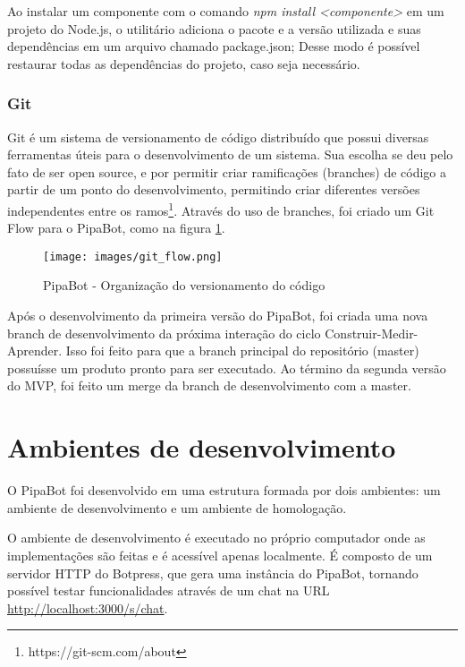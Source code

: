   Ao instalar um componente com o comando \emph{npm install <componente>} em um projeto do Node.js, o utilitário adiciona o pacote e a versão utilizada e suas dependências em um arquivo chamado package.json;  
  Desse modo é possível restaurar todas as dependências do projeto, caso seja necessário.
  
  \subsubsection{Git}
  Git é um sistema de versionamento de código distribuído que possui diversas ferramentas úteis para o desenvolvimento de um sistema. Sua escolha se deu pelo fato de ser open source, e por permitir criar ramificações (branches) de código a partir de um ponto do desenvolvimento, permitindo criar diferentes versões independentes entre os ramos\footnote{https://git-scm.com/about}. Através do uso de branches, foi criado um Git Flow para o PipaBot, como na figura \ref{fig:gitflow}.
  
  \begin{figure}[h!]
  	\begin{center}
  		\texttt{[image: images/git\_flow.png]}
  		\caption{PipaBot - Organização do versionamento do código}
  		\label{fig:gitflow}
  	\end{center}
  \end{figure}
  
  Após o desenvolvimento da primeira versão do PipaBot, foi criada uma nova branch de desenvolvimento da próxima interação do ciclo Construir-Medir-Aprender. Isso foi feito para que a branch principal do repositório (master) possuísse um produto pronto para ser executado. Ao término da segunda versão do MVP, foi feito um merge da branch de desenvolvimento com a master.
  
  

  \section{Ambientes de desenvolvimento} %
  O PipaBot foi desenvolvido em uma estrutura formada por dois ambientes: um ambiente de desenvolvimento e um ambiente de homologação.
  
  O ambiente de desenvolvimento é executado no próprio computador onde as implementações são feitas e é acessível apenas localmente. É composto de um servidor HTTP do Botpress, que gera uma instância do PipaBot, tornando possível testar funcionalidades através de um chat na URL \url{http://localhost:3000/s/chat}.
  
